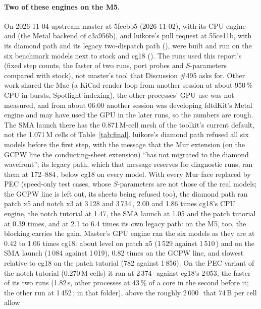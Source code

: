 \paragraph{Two of these engines on the M5.} On 2026-11-04 upstream master at 5fecbb5 (2026-11-02), with its CPU engine
and  (the Metal backend of c3a956b), and luikore's pull request at 55ce11b, with its diamond path
and its legacy two-dispatch path (), were built and run on the six benchmark
models next to stock and cg18 (). The runs used this report's
 (fixed step counts, the faster of two runs, port probes and $S$-parameters compared with stock), not
master's  tool that Discussion \#495 asks for. Other work shared the Mac (a KiCad render loop from
another session at about 950\,\% CPU in bursts, Spotlight indexing), the other processes' GPU use was not measured,
and from about 06:00 another session was developing fdtdKit's Metal engine and may have used the GPU in the later runs,
so the numbers are rough. The SMA launch there has the 0.871\,M-cell mesh of the toolkit's current default, not the
1.071\,M cells of Table~\ref{tab:final}. luikore's diamond path refused all six models before the first step, with the
message that the Mur extension (on the GCPW line the conducting-sheet extension) ``has not migrated to the diamond
wavefront''; its legacy path, which that message reserves for diagnostic runs, ran them at 172--884\,\MC, below cg18
on every model. With every Mur face replaced by PEC (speed-only test cases, whose $S$-parameters are not those of the
real models; the GCPW line is left out, its sheets being refused too), the diamond path ran patch x5 and notch x3 at
3\,128 and 3\,734\,\MC, 2.00 and 1.86 times cg18's CPU engine, the notch tutorial at 1.47, the SMA launch at 1.05 and
the patch tutorial at 0.39 times, and at 2.1 to 6.4 times its own legacy path: on the M5, too, the blocking carries
the gain. Master's GPU engine ran the six models as they are at 0.42 to 1.06 times cg18: about level on patch x5
(1\,529 against 1\,510\,\MC) and on the SMA launch (1\,084 against 1\,019), 0.82 times on the GCPW line, and slowest
relative to cg18 on the patch tutorial (782 against 1\,856). On the PEC variant of the notch tutorial (0.270\,M cells)
it ran at 2\,374\,\MC\ against cg18's 2\,053, the faster of its two runs (1.82\,s, other processes at 43\,\% of a core
in the second before it; the other run at 1\,452\,\MC;
 in that folder), above the roughly 2\,000\,\MC\ that 74\,B per cell allow
